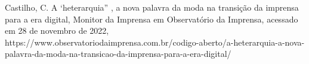 \documentclass[
12pt,		%
openright,	%
twoside,  %
a4paper,			%
chapter=TITLE,		%
english,			%
french,				%
spanish,			%
brazil				%
]{USPSC-classe/USPSC}
\begin{document}
\begin{flushleft}
\begin{flushleft}
\begin{flushleft}
\begin{flushleft}
\begin{flushleft}
\begin{flushleft}
\begin{flushleft}
\begin{flushleft}
\begin{flushleft}
\begin{flushleft}
[CASTILHO, 2008] Castilho, C. A ‘heterarquia” , a nova palavra da moda na transi\c{c}\~ao da imprensa para a era digital, Monitor da Imprensa em Observat\'orio da Imprensa, acessado em 28 de novembro de 2022, https://www.observatoriodaimprensa.com.br/codigo-aberto/a-heterarquia-a-nova-palavra-da-moda-na-transicao-da-imprensa-para-a-era-digital/
\end{flushleft}


\end{flushleft}


\end{flushleft}


\end{flushleft}


\end{flushleft}


\end{flushleft}


\end{flushleft}


\end{flushleft}


\end{flushleft}


\end{flushleft}
\end{document}
